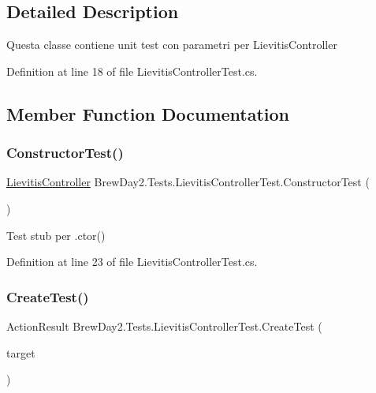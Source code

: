 \subsection{Detailed Description}
Questa classe contiene unit test con parametri per Lievitis\+Controller



Definition at line 18 of file Lievitis\+Controller\+Test.\+cs.



\subsection{Member Function Documentation}
\mbox{\label{class_brew_day2_1_1_tests_1_1_lievitis_controller_test_a2f573de26fd7ca2268b9f919d252090d}} 
\subsubsection{\texorpdfstring{Constructor\+Test()}{ConstructorTest()}}
{\footnotesize\ttfamily \mbox{\hyperlink{class_brew_day2_1_1_controllers_1_1_lievitis_controller}{Lievitis\+Controller}} Brew\+Day2.\+Tests.\+Lievitis\+Controller\+Test.\+Constructor\+Test (\begin{DoxyParamCaption}{ }\end{DoxyParamCaption})}



Test stub per .ctor()



Definition at line 23 of file Lievitis\+Controller\+Test.\+cs.

\mbox{\label{class_brew_day2_1_1_tests_1_1_lievitis_controller_test_a5c9a1a2c52327c3e54759e085441c3fb}} 
\subsubsection{\texorpdfstring{Create\+Test()}{CreateTest()}}
{\footnotesize\ttfamily Action\+Result Brew\+Day2.\+Tests.\+Lievitis\+Controller\+Test.\+Create\+Test (\begin{DoxyParamCaption}\item[{\mbox{[}\+Pex\+Assume\+Under\+Test\mbox{]} \mbox{\hyperlink{class_brew_day2_1_1_controllers_1_1_lievitis_controller}{Lievitis\+Controller}}}]{target }\end{DoxyParamCaption})}



